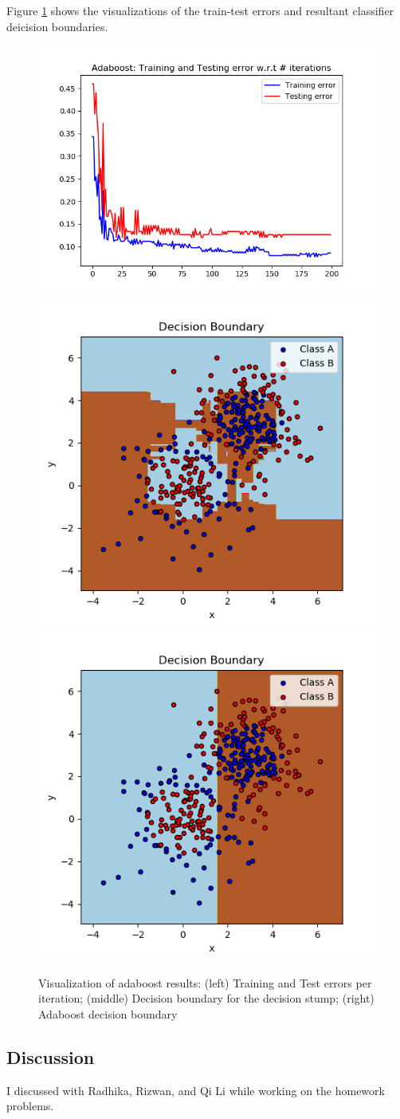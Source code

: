 \documentclass[12pt,letterpaper]{article}
\begin{document}
\begin{enumerate}
Figure \ref{fig:adaboost} shows the visualizations of the train-test errors and resultant classifier deicision boundaries.

\begin{figure}[t]
    \centering
    \includegraphics [width=0.38\linewidth]{train_test_error.png}
    \hfill
    \includegraphics[width=0.3\linewidth]{decision_boundary2.png}
    \hfill
    \includegraphics[width=0.3\linewidth]{decision_boundary.png}
    \caption{Visualization of adaboost results: (left) Training and Test errors per iteration; (middle) Decision boundary for the decision stump; (right) Adaboost decision boundary}
    \label{fig:adaboost}
\end{figure}



\end{enumerate}

\subsection*{Discussion}
I discussed with Radhika, Rizwan, and Qi Li while working on the homework problems.
\end{document}
